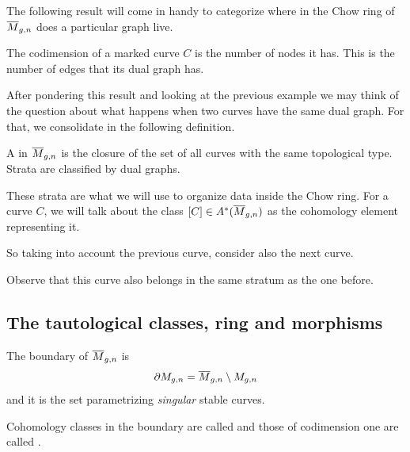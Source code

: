 \documentclass[12pt]{memoir}
\begin{document}
The following result will come in handy to categorize where in the Chow ring of $\overline M_{g,n}$ does a particular graph live.
\begin{Th}
    The codimension of a marked curve $C$ is the number of nodes it has. This is the number of edges that its dual graph has.
\end{Th}

After pondering this result and looking at the previous example we may think of the question about what happens when two curves have the same dual graph. For that, we consolidate in the following definition.

\begin{Def}
    A  in $\overline{M}_{g,n}$ is the closure of the set of all curves with the same topological type. Strata are classified by dual graphs. 
\end{Def}

These strata are what we will use to organize data inside the Chow ring. For a curve $C$, we will talk about the class $[C]\in A^\ast(\overline M_{g,n})$ as the cohomology element representing it. 

\begin{Ex}
    So taking into account the previous curve, consider also the next curve. 

    Observe that this curve also belongs in the same stratum as the one before. 
\end{Ex}

\subsection{The tautological classes, ring and morphisms}

\begin{Def}
    The boundary of $\overline M_{g,n}$ is 
    $$\partial M_{g,n}=\overline M_{g,n}\setminus M_{g,n}$$
    and it is the set parametrizing \emph{singular} stable curves.\par
    Cohomology classes in the boundary are called  and those of codimension one are called .  
\end{Def}
\end{document}
